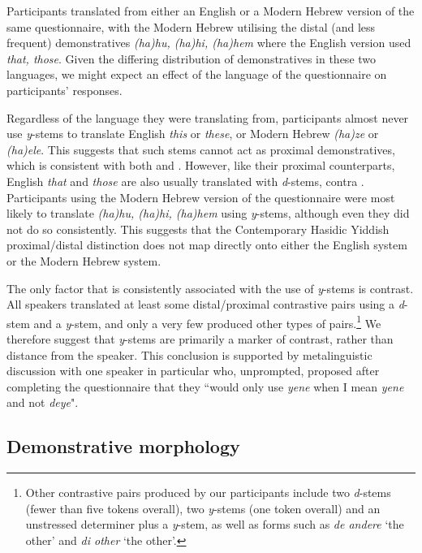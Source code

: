 \documentclass[output=paper, hidelinks]{langscibook}
\begin{document}
Participants translated from either an English or a Modern Hebrew version of the same questionnaire, with the Modern Hebrew utilising the distal (and less frequent) demonstratives \textit{(ha)hu, (ha)hi, (ha)hem} where the English version used \textit{that, those}. Given the differing distribution of demonstratives in these two languages, we might expect an effect of the language of the questionnaire on participants' responses. 

Regardless of the language they were translating from, participants almost never use \textit{y}-stems to translate English \textit{this} or \textit{these}, or Modern Hebrew \textit{(ha)ze} or \textit{(ha)ele}. This suggests that such stems cannot act as proximal demonstratives, which is consistent with both \citet{Jacobs05} and \citet{Katz87}. However, like their proximal counterparts, English \textit{that} and \textit{those} are also usually translated with \textit{d}-stems, contra \citet{Jacobs05}. Participants using the Modern Hebrew version of the questionnaire were most likely to translate \textit{(ha)hu, (ha)hi, (ha)hem} using \textit{y}-stems, although even they did not do so consistently. This suggests that the Contemporary Hasidic Yiddish proximal/distal distinction does not map directly onto either the English system or the Modern Hebrew system. 

The only factor that is consistently associated with the use of \textit{y}-stems is contrast. All speakers translated at least some distal/proximal contrastive pairs using a \textit{d}-stem and a \textit{y}-stem, and only a very few produced other types of pairs.\footnote{Other contrastive pairs produced by our participants include two \textit{d}-stems (fewer than five tokens overall), two \textit{y}-stems (one token overall) and an unstressed determiner plus a \textit{y}-stem, as well as forms such as \textit{de andere} `the other' and \textit{di other} `the other'.} We therefore suggest that \textit{y}-stems are primarily a marker of contrast, rather than distance from the speaker. This conclusion is supported by metalinguistic discussion with one speaker in particular who, unprompted, proposed after completing the questionnaire that they ``would only use \textit{yene} when I mean \textit{yene} and not \textit{deye}". 




\subsection{Demonstrative morphology}
\end{document}
